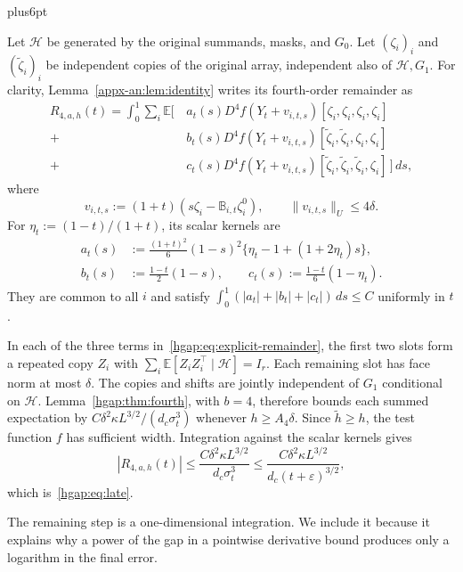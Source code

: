 \documentclass[11pt,letterpaper,twoside,leqno]{article}
\makeatletter
\theoremstyle{bookplain}
\theoremstyle{bookremark}
\renewenvironment{proof}[1][\proofname]{\par
  \pushQED{\qed}\normalfont\topsep6pt plus6pt\relax
  \trivlist\item[\hskip\labelsep\bfseries #1\@addpunct{.}]\ignorespaces
}{\popQED\endtrivlist\@endpefalse}
\newcommand{\E}{\mathbb E}
\newcommand{\dd}{\,d}
\makeatother
\begin{document}
\begin{proof}[Proof of the late bound~\eqref{hgap:eq:late}]
Let $\mathcal H$ be generated by the original summands, masks, and
$G_0$. Let $(\zeta_i)_i$ and $(\widetilde\zeta_i)_i$ be independent
copies of the original array, independent also of $\mathcal H,G_1$.
For clarity, Lemma~\ref{appx-an:lem:identity} writes
its fourth-order remainder as
\begin{equation}\label{hgap:eq:explicit-remainder}
\begin{split}
 R_{4,a,h}(t)=\int_0^1\sum_i\E\bigl[\,
 &a_t(s)D^4f(Y_t+v_{i,t,s})[\zeta_i,\zeta_i,\zeta_i,\zeta_i]\\
 {}+{}&b_t(s)D^4f(Y_t+v_{i,t,s})
                    [\widetilde\zeta_i,\widetilde\zeta_i,\zeta_i,\zeta_i]\\
 {}+{}&c_t(s)D^4f(Y_t+v_{i,t,s})
           [\widetilde\zeta_i,\widetilde\zeta_i,\widetilde\zeta_i,\zeta_i]
                              \,\bigr]\dd s,
\end{split}
\end{equation}
where
\[
 v_{i,t,s}:=(1+t)(s\zeta_i-\mathbb B_{i,t}\zeta_i^0),
 \qquad \|v_{i,t,s}\|_U\le4\delta.
\]
For $\eta_t:=(1-t)/(1+t)$, its scalar kernels are
\begin{align*}
 a_t(s)&:=\frac{(1+t)^2}{6}(1-s)^2
                  \{\eta_t-1+(1+2\eta_t)s\},\\
 b_t(s)&:=\frac{1-t}{2}(1-s),\qquad
 c_t(s):=\frac{1-t}{6}(1-\eta_t).
\end{align*}
They are common to all $i$ and satisfy
$\int_0^1(|a_t|+|b_t|+|c_t|)\dd s\le C$ uniformly in $t$.

In each of the three terms in~\eqref{hgap:eq:explicit-remainder}, the first
two slots form a repeated copy $Z_i$ with
$\sum_i\E[Z_iZ_i^\top\mid\mathcal H]=I_r$.
Each remaining slot has face norm at most $\delta$. The copies and
shifts are jointly independent of $G_1$ conditional on $\mathcal H$.
Lemma~\ref{hgap:thm:fourth}, with $b=4$, therefore bounds each summed
expectation by $C\delta^2\kappa L^{3/2}/(d_c\sigma_t^3)$ whenever
$h\ge A_4\delta$. Since $\widetilde h\ge h$, the test function $f$
has sufficient width. Integration against the scalar kernels gives
\[
 |R_{4,a,h}(t)|\le\frac{C\delta^2\kappa L^{3/2}}{d_c\sigma_t^3}
     \le\frac{C\delta^2\kappa L^{3/2}}{d_c(t+\varepsilon)^{3/2}},
\]
which is~\eqref{hgap:eq:late}.
\end{proof}

The remaining step is a one-dimensional integration. We include it
because it explains why a power of the gap in a pointwise derivative
bound produces only a logarithm in the final error.
\end{document}
